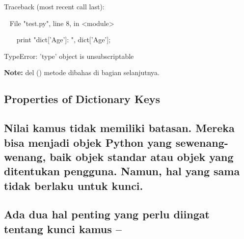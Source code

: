 \noindent 
{\fontsize{9pt}{9pt}\selectfont  \hspace*{0.5in} Traceback (most recent call last):} \par
\noindent 
{\fontsize{9pt}{9pt}\selectfont ~  \hspace*{0.5in} File "test.py", line 8, in <module>} \par
\noindent 
{\fontsize{9pt}{9pt}\selectfont ~~~  \hspace*{0.5in}  \hspace*{0.5in} print "dict['Age']: ", dict['Age'];} \par
\noindent 
{\fontsize{9pt}{9pt}\selectfont  \hspace*{0.5in} TypeError: 'type' object is unsubscriptable} \par
\begin{adjustwidth}{0.03in}{0.03in}
\textbf{Note:} del () metode dibahas di bagian selanjutnya.\end{adjustwidth}
 \par
\vspace{12pt}
\subsection*{Properties of Dictionary Keys}
 \par
\subsection*{Nilai kamus tidak memiliki batasan. Mereka bisa menjadi objek Python yang sewenang-wenang, baik objek standar atau objek yang ditentukan pengguna. Namun, hal yang sama tidak berlaku untuk kunci.}
 \par
\subsection*{Ada dua hal penting yang perlu diingat tentang kunci kamus –}
 \par
